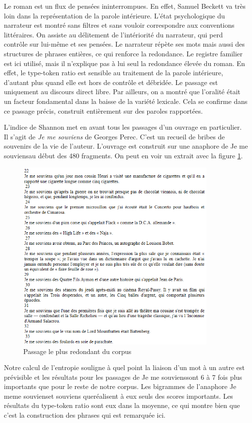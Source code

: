 \documentclass[a4paper,twoside,12pt]{book}
\begin{document}
Le roman est un flux de pensées ininterrompues. En effet, Samuel Beckett va très loin dans la représentation de la parole intérieure. L'état psychologique du narrateur est montré sans filtres et sans vouloir correspondre aux conventions littéraires. On assiste au délitement de l’intériorité du narrateur, qui perd contrôle sur lui-même et ses pensées. Le narrateur répète ses mots mais aussi des structures de phrases entières, ce qui renforce la redondance. Le registre familier est ici utilisé, mais il n'explique pas à lui seul la redondance élevée du roman. En effet, le type-token ratio est sensible au traitement de la parole intérieure, d'autant plus quand elle est hors de contrôle et débridée. Le passage est uniquement au discours direct libre. Par ailleurs, on a montré que l'oralité était un facteur fondamental dans la baisse de la variété lexicale. Cela se confirme dans ce passage précis, construit entièrement sur des paroles rapportées. 

L'indice de Shannon met en avant tous les passages d'un ouvrage en particulier. Il s'agit de \textit{Je me souviens} de Georges Perec. C'est un recueil de bribes de souvenirs de la vie de l'auteur. L'ouvrage est construit sur une anaphore de \og Je me souviens\fg au début des 480 fragments. On peut en voir un extrait avec la figure \ref{jemesouviens}.
\bigskip
\begin{figure}[!ht]
    \centering
    \includegraphics[width=10cm]{img/13_passage_shannon_grand.png}
    \caption{Passage le plus redondant du corpus}
    \label{jemesouviens}
\end{figure}
\bigskip

Notre calcul de l'entropie souligne à quel point la liaison d'un mot à un autre est prévisible et les résultats pour les passages de \og Je me souviens\fg sont 6 à 7 fois plus importants que pour le reste de notre corpus. Les bigrammes de l'anaphore \og Je me\fg \og me souviens\fg et \og souviens que\fg réalisent à eux seuls des scores importants. Les résultats du type-token ratio sont eux dans la moyenne, ce qui montre bien que c'est la construction des phrases qui est remarquée ici.
\end{document}
